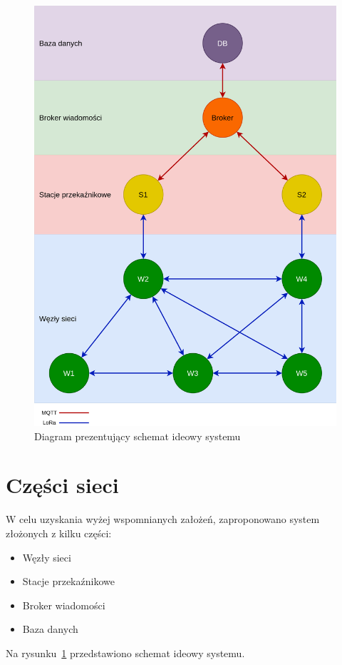 \begin{figure}[b]
    \begin{center}
        \includegraphics[width=15cm]{pic/diagram-systemu.png}
    \end{center}
    \caption{Diagram prezentujący schemat ideowy systemu}\label{rys:system-diagram}
\end{figure}

\section{Części sieci}
W celu uzyskania wyżej wspomnianych założeń, zaproponowano system złożonych z kilku części:
\begin{itemize}
    \item Węzły sieci
    \item Stacje przekaźnikowe
    \item Broker wiadomości
    \item Baza danych
\end{itemize}
Na rysunku~\ref{rys:system-diagram} przedstawiono schemat ideowy systemu.
